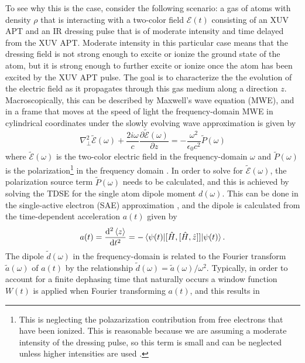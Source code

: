 To see why this is the case, consider the following scenario: a gas of atoms with density $\rho$ that is interacting with a two-color field $\mathcal{E}(t)$ consisting of an XUV APT and an IR dressing pulse that is of moderate intensity and time delayed from the XUV APT. Moderate intensity in this particular case means that the dressing field is not strong enough to excite or ionize the ground state of the atom, but it is strong enough to further excite or ionize once the atom has been excited by the XUV APT pulse.  The goal is to characterize the the evolution of the electric field as it propagates through this gas medium along a direction $z$. Macroscopically, this can be described by Maxwell's wave equation (MWE), and in a frame that moves at the speed of light the frequency-domain MWE in cylindrical coordinates under the slowly evolving wave approximation is given by
\begin{equation}
	\label{eqn:MWE}
	\nabla_{\perp}^{2}\tilde{\mathcal{E}}(\omega) + \frac{2i\omega}{c}\frac{\partial \tilde{\mathcal{E}}(\omega)}{\partial z} = -\frac{\omega^2}{\epsilon_0 c^2}\tilde{P}(\omega)
\end{equation}
where $\tilde{\mathcal{E}}(\omega)$ is the two-color electric field in the frequency-domain $\omega$ and $\tilde{P}(\omega)$ is the polarization\footnote{This is neglecting the polazarization contribution from free electrons that have been ionized.  This is reasonable because we are assuming a moderate intensity of the dressing pulse, so this term is small and can be neglected unless higher intensities are used \cite{gaardeTransientAbsorptionReshaping2011}.} in the frequency domain \cite{jacksonClassicalElectrodynamics1999, brabecIntenseFewcycleLaser2000, wuTheoryStrongfieldAttosecond2016, gaardeTransientAbsorptionReshaping2011}. In order to solve for $\tilde{\mathcal{E}}(\omega)$, the polarization source term $\tilde{P}(\omega)$ needs to be calculated, and this is achieved by solving the TDSE for the single atom dipole moment $d(\omega)$.  This can be done in the single-active electron (SAE) approximation \cite{eberlyNumericalExperimentsStrong1992, schaferHighHarmonicGeneration1997}, and the dipole is calculated from the time-dependent acceleration $a(t)$ given by 
\begin{equation}
	a(t)=\frac{\mathop{}\!\mathrm{d}^2 \braket{z}}{\mathop{}\!\mathrm{d} t^2} = -\braket{\psi(t)|[\hat{H},[\hat{H},\hat{z}]]|\psi(t)}.
\end{equation}
The dipole $\tilde{d}(\omega)$ in the frequency-domain is related to the Fourier transform $\tilde{a}(\omega)$ of $a(t)$ by the relationship $\tilde{d}(\omega)=\tilde{a}(\omega)/\omega^2$.  Typically, in order to account for a finite dephasing time that naturally occurs a window function $W(t)$ is applied when Fourier transforming $a(t)$, and this results in

